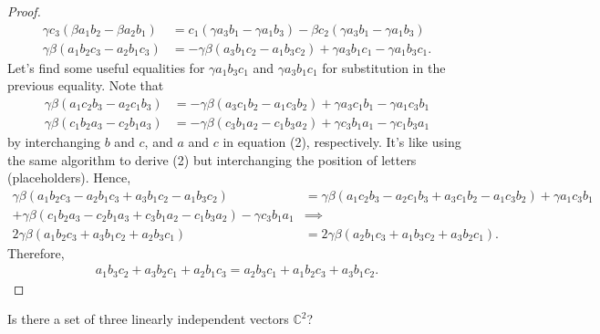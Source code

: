 \documentclass[12pt]{article}
\newenvironment{problem}[2][Problem]{\begin{trivlist} \item[\hskip \labelsep {\bfseries #1}\hskip \labelsep {\bfseries #2.}]}{\end{trivlist}}
\newenvironment{solution}[1][Solution]{\begin{trivlist} \item[\hskip \labelsep {\bfseries #1}]}{\end{trivlist}}
\begin{document}
\begin{problem}{5}
\begin{enumerate}
\begin{solution}
\begin{proof}
\begin{align}
  \gamma c_{3}(\beta a_{1}b_{2} -\beta a_{2}b_{1}) &= c_{1}(\gamma a_{3}b_{1} - \gamma a_{1}b_{3}) - \beta c_{2} (\gamma a_{3}b_{1} - \gamma a_{1}b_{3})\\
  \gamma\beta(a_{1}b_{2}c_{3} - a_{2}b_{1}c_{3}) &= - \gamma \beta (a_{3}b_{1}c_{2} - a_{1}b_{3}c_{2}) + \gamma a_{3}b_{1}c_{1} - \gamma a_{1}b_{3}c_{1}.
\end{align}
Let's find some useful equalities for $\gamma a_{1}b_{3}c_{1}$ and $\gamma a_{3}b_{1}c_{1}$ for substitution in the previous equality. Note that   
\begin{align*}
  \gamma\beta(a_{1}c_{2}b_{3} - a_{2}c_{1}b_{3}) &= - \gamma \beta (a_{3}c_{1}b_{2} - a_{1}c_{3}b_{2}) + \gamma a_{3}c_{1}b_{1} - \gamma a_{1}c_{3}b_{1}\\
  \gamma\beta(c_{1}b_{2}a_{3} - c_{2}b_{1}a_{3}) &= - \gamma \beta (c_{3}b_{1}a_{2} - c_{1}b_{3}a_{2}) + \gamma c_{3}b_{1}a_{1} - \gamma c_{1}b_{3}a_{1}
\end{align*}
by interchanging $b$ and $c$, and $a$ and $c$ in equation (2), respectively. It's like using the same algorithm to derive (2) but interchanging the position of letters (placeholders). Hence,
\begin{align*}
  \gamma\beta (a_{1}b_{2}c_{3} - a_{2}b_{1}c_{3} + a_{3}b_{1}c_{2} - a_{1}b_{3}c_{2}) &= \gamma\beta (a_{1}c_{2}b_{3}-a_{2}c_{1}b_{3}+a_{3}c_{1}b_{2}-a_{1}c_{3}b_{2}) + \gamma a_{1}c_{3}b_{1}\\
  + \gamma\beta (c_{1}b_{2}a_{3} - c_{2}b_{1}a_{3} + c_{3}b_{1}a_{2} - c_{1}b_{3}a_{2}) - \gamma c_{3}b_{1}a_{1} &\implies\\
  2\gamma\beta (a_{1}b_{2}c_{3} + a_{3}b_{1}c_{2} + a_{2}b_{3}c_{1}) &= 2\gamma\beta (a_{2}b_{1}c_{3} +a_{1}b_{3}c_{2}+a_{3}b_{2}c_{1}).  
\end{align*}
Therefore,  
\begin{align*}
  a_{1}b_{3}c_{2} + a_{3}b_{2}c_{1} + a_{2}b_{1}c_{3} = a_{2}b_{3}c_{1} + a_{1}b_{2}c_{3} + a_{3}b_{1}c_{2}.
\end{align*}
\end{proof}
\end{solution}
  \item Is there a set of three linearly independent vectors $\mathbb{C}^{2}$?
\end{enumerate}
\end{problem}
\end{document}
